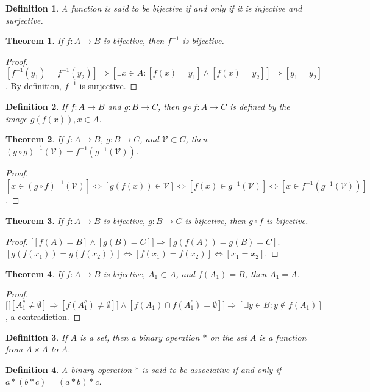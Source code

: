 \documentclass[crop=false,class=book]{standalone}
\theoremstyle{mystyle}
\newtheorem{theorem}{Theorem}[section]
\newtheorem{definition}{Definition}[section]
\begin{document}
\begin{definition}
A function is said to be bijective if and only if it is injective and surjective.
\end{definition}
\begin{theorem}
If $f:A\rightarrow B$ is bijective, then $f^{-1}$ is bijective.
\end{theorem}
\begin{proof}
$[f^{-1}(y_1) = f^{-1}(y_2)]\Rightarrow [\exists x\in A:[f(x) = y_1]\land [f(x)=y_2]]\Rightarrow [y_1=y_2]$. By definition, $f^{-1}$ is surjective.
\end{proof}
\begin{definition}
If $f:A\rightarrow B$ and $g:B\rightarrow C$, then $g\circ f:A\rightarrow C$ is defined by the image $g(f(x)), x\in A$. 
\end{definition}
\begin{theorem}
If $f:A\rightarrow B$, $g:B\rightarrow C$, and $\mathcal{V}\subset C$, then $(g\circ g)^{-1}(\mathcal{V}) = f^{-1}(g^{-1}(\mathcal{V}))$.
\end{theorem}
\begin{proof}
$[x\in (g\circ f)^{-1}(\mathcal{V})]\Leftrightarrow [g(f(x))\in \mathcal{V}] \Leftrightarrow [f(x)\in g^{-1}(\mathcal{V})]\Leftrightarrow [x\in f^{-1}(g^{-1}(\mathcal{V}))]$.
\end{proof}
\begin{theorem}
If $f:A\rightarrow B$ is bijective, $g:B\rightarrow C$ is bijective, then $g\circ f$ is bijective.
\end{theorem}
\begin{proof}
$\big[[f(A) = B]\land [g(B) = C]\big]\Rightarrow [g(f(A)) = g(B) = C]$. $[g(f(x_1))=g(f(x_2))]\Leftrightarrow [f(x_1)=f(x_2)]\Leftrightarrow [x_1=x_2]$.
\end{proof}
\begin{theorem}
If $f:A\rightarrow B$ is bijective, $A_1\subset A$, and $f(A_1) = B$, then $A_1=A$.
\end{theorem}
\begin{proof}
$\Big[\big[[A_1^c \ne \emptyset]\Rightarrow [f(A_1^c) \ne \emptyset]\big]\land[f(A_1)\cap f(A_1^c) = \emptyset]\Big]\Rightarrow [\exists y\in B:y\notin f(A_1)]$, a contradiction.
\end{proof}
\begin{definition}
If $A$ is a set, then a binary operation $*$ on the set $A$ is a function from $A\times A$ to $A$.
\end{definition}
\begin{definition}
A binary operation $*$ is said to be associative if and only if $a*(b*c) = (a*b)*c$.
\end{definition}
\end{document}
